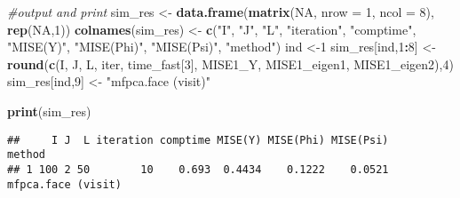 \documentclass[
]{article}
\newenvironment{Shaded}{\begin{snugshade}}{\end{snugshade}}
\newcommand{\AttributeTok}[1]{\textcolor[rgb]{0.13,0.29,0.53}{#1}}
\newcommand{\CommentTok}[1]{\textcolor[rgb]{0.56,0.35,0.01}{\textit{#1}}}
\newcommand{\ConstantTok}[1]{\textcolor[rgb]{0.56,0.35,0.01}{#1}}
\newcommand{\DecValTok}[1]{\textcolor[rgb]{0.00,0.00,0.81}{#1}}
\newcommand{\FunctionTok}[1]{\textcolor[rgb]{0.13,0.29,0.53}{\textbf{#1}}}
\newcommand{\NormalTok}[1]{#1}
\newcommand{\OtherTok}[1]{\textcolor[rgb]{0.56,0.35,0.01}{#1}}
\newcommand{\SpecialCharTok}[1]{\textcolor[rgb]{0.81,0.36,0.00}{\textbf{#1}}}
\newcommand{\StringTok}[1]{\textcolor[rgb]{0.31,0.60,0.02}{#1}}
\begin{document}
\begin{Shaded}
\begin{Highlighting}[]
  \CommentTok{\#output and print}
\NormalTok{  sim\_res }\OtherTok{\textless{}{-}} \FunctionTok{data.frame}\NormalTok{(}\FunctionTok{matrix}\NormalTok{(}\ConstantTok{NA}\NormalTok{, }\AttributeTok{nrow =} \DecValTok{1}\NormalTok{, }\AttributeTok{ncol =} \DecValTok{8}\NormalTok{), }\FunctionTok{rep}\NormalTok{(}\ConstantTok{NA}\NormalTok{,}\DecValTok{1}\NormalTok{))}
  \FunctionTok{colnames}\NormalTok{(sim\_res) }\OtherTok{\textless{}{-}} \FunctionTok{c}\NormalTok{(}\StringTok{"I"}\NormalTok{, }\StringTok{"J"}\NormalTok{, }\StringTok{"L"}\NormalTok{, }\StringTok{"iteration"}\NormalTok{, }
                         \StringTok{"comptime"}\NormalTok{, }\StringTok{"MISE(Y)"}\NormalTok{, }\StringTok{"MISE(Phi)"}\NormalTok{, }\StringTok{"MISE(Psi)"}\NormalTok{, }\StringTok{"method"}\NormalTok{)}
\NormalTok{  ind }\OtherTok{\textless{}{-}}\DecValTok{1} 
\NormalTok{  sim\_res[ind,}\DecValTok{1}\SpecialCharTok{:}\DecValTok{8}\NormalTok{] }\OtherTok{\textless{}{-}} \FunctionTok{round}\NormalTok{(}\FunctionTok{c}\NormalTok{(I, J, L, iter, time\_fast[}\DecValTok{3}\NormalTok{], MISE1\_Y, MISE1\_eigen1, MISE1\_eigen2),}\DecValTok{4}\NormalTok{)}
\NormalTok{  sim\_res[ind,}\DecValTok{9}\NormalTok{] }\OtherTok{\textless{}{-}} \StringTok{"mfpca.face (visit)"}
  
  \FunctionTok{print}\NormalTok{(sim\_res)}
\end{Highlighting}
\end{Shaded}

\begin{verbatim}
##     I J  L iteration comptime MISE(Y) MISE(Phi) MISE(Psi)             method
## 1 100 2 50        10    0.693  0.4434    0.1222    0.0521 mfpca.face (visit)
\end{verbatim}
\end{document}
